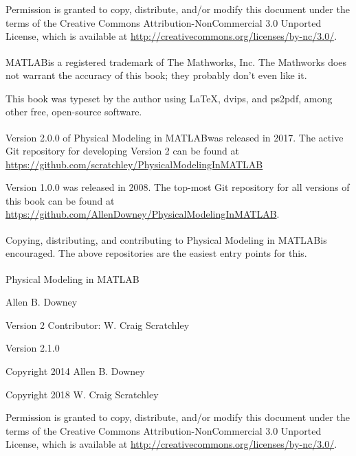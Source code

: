 \documentclass[
]{book}
\newcommand{\myreg}{\textsuperscript{{\tiny \textregistered}}}
\newcommand{\thetitle}{Physical Modeling in MATLAB\myreg}
\newcommand{\theversion}{2.1.0}
\begin{document}
\begin{latexonly}
\vspace{2em}

Permission is granted to copy, distribute, and/or modify this document
under the terms of the Creative Commons Attribution-NonCommercial 3.0 Unported
License, which is available at \url{http://creativecommons.org/licenses/by-nc/3.0/}.

MATLAB\myreg is a registered trademark of The
Mathworks, Inc.  The Mathworks does not warrant the accuracy
of this book; they probably don't even like it.

\vspace{2em}

This book was typeset by the author using \LaTeX, dvips, and ps2pdf,
among other free, open-source software.

Version 2.0.0 of \thetitle was released in 2017. The active Git
    repository for developing Version 2 can be found at
    \url{https://github.com/scratchley/PhysicalModelingInMATLAB}

Version 1.0.0 was released in 2008. The top-most Git repository
for all versions of this book can be found at
\url{https://github.com/AllenDowney/PhysicalModelingInMATLAB}.


Copying, distributing, and contributing to \thetitle is encouraged.
The above repositories are the easiest entry points for this.

\end{latexonly}



\begin{htmlonly}


{\Large \thetitle}

{\large Allen B. Downey}

{\large Version 2 Contributor:  W. Craig Scratchley}

Version \theversion

Copyright 2014 Allen B. Downey

Copyright 2018 W. Craig Scratchley

\vspace{0.25in}

Permission is granted to copy, distribute, and/or modify this document
under the terms of the Creative Commons Attribution-NonCommercial 3.0
Unported License, which is available at
\url{http://creativecommons.org/licenses/by-nc/3.0/}.

\setcounter{chapter}{-1}

\end{htmlonly}
\end{document}

